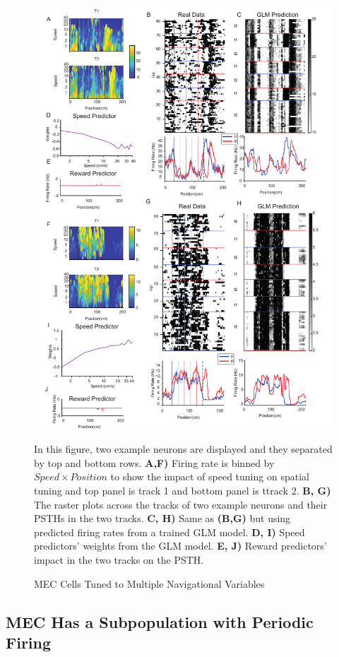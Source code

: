 \begin{figure}
    \centering
    \includegraphics[width=1\linewidth]{figures//Chapter 5 MEC/fig3_multiple_navigational_variables.pdf}
    \caption{MEC Cells Tuned to Multiple Navigational Variables}
    
    \label{fig:placeholder}
\medskip
\small
In this figure, two example neurons are displayed and they separated by top and bottom rows. \textbf{A,F)} Firing rate is binned by \(Speed \times Position\) to show the impact of speed tuning on spatial tuning and top panel is track 1 and bottom panel is ttrack 2. \textbf{B, G)} The raster plots across the tracks of two example neurons and their PSTHs in the two tracks. \textbf{C, H)} Same as \textbf{(B,G)} but using predicted firing rates from a trained GLM model. \textbf{D, I)} Speed predictors' weights from the GLM model. \textbf{E, J)} Reward predictors' impact in the two tracks on the PSTH.
\end{figure}




\subsection{MEC Has a Subpopulation with Periodic Firing}
